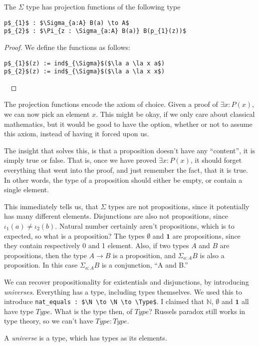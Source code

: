 \documentclass[a4paper, 12pt]{article}
\newcommand{\N}{\mathbb{N}}
\newcommand{\Type}{\mathit{Type}}
\newcommand{\la}[1]{\lambda{#1}.\,}
\theoremstyle{changedot}
\theoremstyle{changedotbreak}
\theoremstyle{nonumberplain}
\newtheorem{proof}{Proof}
\begin{document}
\begin{theorem}
  The $\Sigma$ type has projection functions of the following type
\begin{lstlisting}
p$_{1}$ : $\Sigma_{a:A} B(a) \to A$
p$_{2}$ : $\Pi_{z : \Sigma_{a:A} B(a)} B(p_{1}(z))$
\end{lstlisting}
\end{theorem}
\begin{proof}
  We define the functions as follows:
\begin{lstlisting}
p$_{1}$(z) := ind$_{\Sigma}$($\la a \la x a$)
p$_{2}$(z) := ind$_{\Sigma}$($\la a \la x x$)
\end{lstlisting}
~
\end{proof}

The projection functions encode the axiom of choice. Given a proof of $\exists x: P(x)$, we can now pick an element $x$. This might be okay, if we only care about classical mathematics, but it would be good to have the option, whether or not to assume this axiom, instead of having it forced upon us.

The insight that solves this, is that a proposition doesn't have any ``content'', it is simply true or false. That is, once we have proved $\exists x: P(x)$, it should forget everything that went into the proof, and just remember the fact, that it is true. In other words, the type of a proposition should either be empty, or contain a single element.

This immediately tells us, that $\Sigma$ types are not propositions, since it potentially has many different elements. Disjunctions are also not propositions, since $\iota_{1}(a) \neq \iota_{2}(b)$. Natural number certainly aren't propositions, which is to expected, so what is a proposition? The types $\emptyset$ and $\mathbf 1$ are propositions, since they contain respectively 0 and 1 element. Also, if two types $A$ and $B$ are propositions, then the type $A \to B$ is a proposition, and $\Sigma_{a:A}B$ is also a proposition. In this case $\Sigma_{a:A}B$ is a conjunction, ``A and B.''

We can recover propositionality for existentials and disjunctions, by introducing \textit{universes}. Everything has a type, including types themselves. We used this to introduce \lstinline{nat_equals : $\N \to \N \to \Type$}. I claimed that $\N$, $\emptyset$ and $\mathbf 1$ all have type $\Type$. What is the type then, of $\Type$? Russels paradox still works in type theory, so we can't have $\Type : \Type$.

\begin{definition}
  A \textit{universe} is a type, which has types as its elements.
\end{definition}
\end{document}
